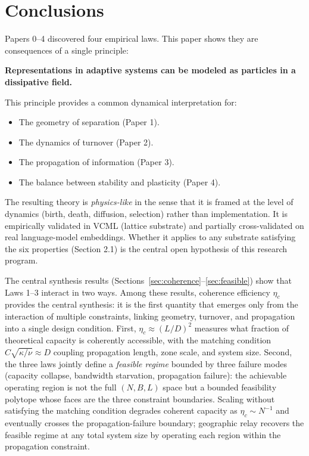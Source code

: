 \documentclass[11pt]{article}
\begin{document}
\section{Conclusions}

Papers 0--4 \cite{aubin2026p0,aubin2026capacity,aubin2026bandwidth,aubin2026propagation,aubin2026stability} discovered four empirical laws. This paper shows they are consequences of a single principle:

\textbf{Representations in adaptive systems can be modeled as particles in a dissipative field.}

This principle provides a common dynamical interpretation for:
\begin{itemize}
\item The geometry of separation (Paper 1).
\item The dynamics of turnover (Paper 2).
\item The propagation of information (Paper 3).
\item The balance between stability and plasticity (Paper 4).
\end{itemize}

The resulting theory is \emph{physics-like} in the sense that it is framed at the level of dynamics (birth, death, diffusion, selection) rather than implementation. It is empirically validated in VCML (lattice substrate) and partially cross-validated on real language-model embeddings. Whether it applies to any substrate satisfying the six properties (Section 2.1) is the central open hypothesis of this research program.

The central synthesis results (Sections~\ref{sec:coherence}--\ref{sec:feasible}) show that Laws 1--3 interact in two ways.
Among these results, coherence efficiency $\eta_c$ provides the central synthesis: it is the first quantity that emerges only from the interaction of multiple constraints, linking geometry, turnover, and propagation into a single design condition.
First, $\eta_c \approx (L/D)^2$ measures what fraction of theoretical capacity is coherently accessible, with the matching condition $C\sqrt{\kappa/\nu} \approx D$ coupling propagation length, zone scale, and system size.
Second, the three laws jointly define a \emph{feasible regime} bounded by three failure modes (capacity collapse, bandwidth starvation, propagation failure): the achievable operating region is not the full $(N, B, L)$ space but a bounded feasibility polytope whose faces are the three constraint boundaries.
Scaling without satisfying the matching condition degrades coherent capacity as $\eta_c \sim N^{-1}$ and eventually crosses the propagation-failure boundary; geographic relay recovers the feasible regime at any total system size by operating each region within the propagation constraint.
\end{document}
